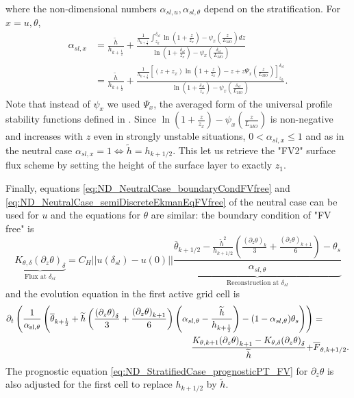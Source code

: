where the non-dimensional numbers $\alpha_{sl, u},
\alpha_{sl, \theta}$ depend on the stratification. For $x=u, \theta$,
\begin{equation}
	\begin{aligned}
	\alpha_{sl, x} &= \frac{\widetilde{h}}{h_{k+\frac{1}{2}}} +
	\frac{\frac{1}{h_{k+\frac{1}{2}}}\int_{z_k}^{\delta_{sl}}
	\ln(1+\frac{z}{z_{x}})- \psi_x\left(\frac{z}{L_{MO}}\right)
	dz}{\ln(1+\frac{\delta_{sl}}{z_{x}})- \psi_x\left(\frac{\delta_{sl}}{L_{MO}}\right)
    } \\
		&=\frac{\widetilde{h}}{h_{k+\frac{1}{2}}} +
 \frac{\frac{1}{{h_{k+\frac{1}{2}}}}
    \left[
	    (z+z_{x})\ln(1+\frac{z}{z_{x}})-z
    +
    z \Psi_x\left(\frac{z}{L_{MO}}\right) \right]_{z_k}^{\delta_{sl}}
    }{\ln(1+\frac{\delta_{sl}}{z_{x}})- \psi_x\left(\frac{\delta_{sl}}{L_{MO}}\right)
    }.
\end{aligned}
\end{equation}
Note that instead of $\psi_x$ we used $\Psi_x$,
the averaged form of the universal
profile stability functions defined in \citep{nishizawa_surface_2018}.
%
Since $\ln(1+\frac{z}{z_{x}})-
\psi_x(\frac{z}{L_{MO}})$ is non-negative and increases with $z$ even
in strongly unstable situations,
$0 < \alpha_{sl, x} \leq 1$ and as in the neutral case
$\alpha_{sl, x}=1 \iff \widetilde{h}=h_{k+1/2}$. This let us retrieve
the "FV2" surface flux scheme by setting the height of the surface
layer to exactly $z_1$.
\par
Finally, equations \eqref{eq:ND_NeutralCase_boundaryCondFVfree} and
\eqref{eq:ND_NeutralCase_semiDiscreteEkmanEqFVfree} of the
neutral case can be used for
$u$ and the equations for $\theta$ are similar:
the boundary condition of "FV free" is
\begin{equation}
	\label{eq:ND_StratifiedCase_semiDiscreteEkmanEqFVfree}
	\underbrace{K_{\theta, \delta} (\partial_z \theta)_\delta}_{
		\text{Flux at } \delta_{sl}
	} = 
	C_H ||u(\delta_{sl})-u(0)||
	\underbrace{
	\frac{
  \overline{\theta}_{k+1/2} - \frac{\widetilde{h}^2}{h_{k+1/2}}
	(\frac{{(\partial_z \theta)}_k}{3} +
	\frac{{(\partial_z \theta)}_{k+1}}{6}) 
  - \theta_s
}{\alpha_{sl, \theta}}
	}_{\text{Reconstruction at } \delta_{sl}}
\end{equation}
and the evolution equation in the first active grid cell is
\begin{equation}
    \begin{aligned}
	\label{eq:ND_StratifiedCase_semiDiscreteEkmanEqPTFVfree}
	    \partial_t \left(\frac{1}{\alpha_{\rm sl, \theta}}
	    \left(
	    \overline{\theta}_{k+\frac{1}{2}} +
	\widetilde{h}\left(\frac{{(\partial_z \theta)}_\delta}{3} +
	\frac{{(\partial_z \theta)}_{k+1}}{6}\right)
		\left(\alpha_{sl, \theta} -
	    	\frac{\widetilde{h}}{h_{k+\frac{1}{2}}}\right)
	 - (1 - \alpha_{sl, \theta})\theta_s
	    \right) \right)&
	= \\
	    \frac{K_{\theta, k+1}{(\partial_z \theta)}_{k+1} -
	K_{\theta,\delta} {(\partial_z \theta)}_\delta}{\widetilde{h}}
	    + &\overline{F}_{\theta, k+1/2}.
    \end{aligned}
\end{equation}
The prognostic equation \eqref{eq:ND_StratifiedCase_prognosticPT_FV}
for $\partial_z \theta$ is also adjusted for the first
cell to replace $h_{k+1/2}$ by $\widetilde{h}$.
